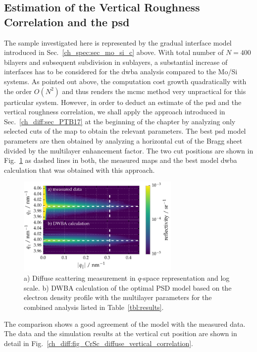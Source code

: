 \subsection{Estimation of the Vertical Roughness Correlation and the \gls{psd}}
The sample investigated here is represented by the gradual interface model introduced in Sec.~\ref{ch_spec:sec_mo_si_c} above. With total number of $N=400$ bilayers and subsequent subdivision in sublayers, a substantial increase of interfaces has to be considered for the \gls{dwba} analysis compared to the Mo/Si systems. As pointed out above, the computation cost growth quadratically with the order $O(N^2)$ and thus renders the \gls{mcmc} method very unpractical for this particular system. However, in order to deduct an estimate of the \gls{psd} and the vertical roughness correlation, we shall apply the approach introduced in Sec.~\ref{ch_diff:sec_PTB17} at the beginning of the chapter by analyzing only selected cuts of the map to obtain the relevant parameters. The best \gls{psd} model parameters are then obtained by analyzing a horizontal cut of the Bragg sheet divided by the multilayer enhancement factor. The two cut positions are shown in Fig.~\ref{ch_diff:fig_CrSc_diffuse_measured_vs_dwba} as dashed lines in both, the measured maps and the best model \gls{dwba} calculation that was obtained with this approach.
\begin{figure}[htbp]
  \centering
  \includegraphics[width=0.7\textwidth]{img/CrSc_diffuse_measured_vs_dwba}
  \caption{a) Diffuse scattering measurement in $q$-space representation and 
log scale. b) DWBA calculation of the optimal PSD model based on the electron 
density profile with the multilayer parameters for the combined analysis listed 
in Table~\ref{tbl:results}.}
  \label{ch_diff:fig_CrSc_diffuse_measured_vs_dwba}
\end{figure}
The comparison shows a good agreement of the model with the measured data. The data and the simulation results at the vertical cut position are shown in detail in Fig.~\ref{ch_diff:fig_CrSc_diffuse_vertical_correlation}.
